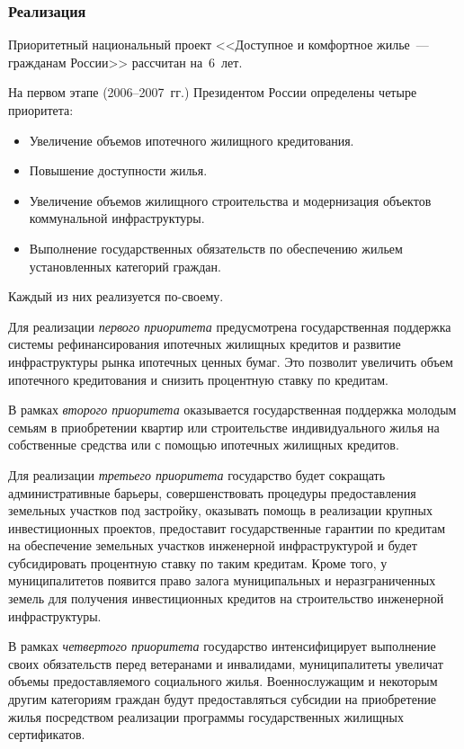 \documentclass[article, 12pt, russian, oneside]{ncc}
\begin{document}
\subsubsection{Реализация}

Приоритетный национальный проект <<Доступное и комфортное жилье~--- гражданам России>> рассчитан на~6~лет.

На первом этапе (2006--2007~гг.) Президентом России определены четыре приоритета:

\begin{itemize}
\item Увеличение объемов ипотечного жилищного кредитования.
\item Повышение доступности жилья.
\item Увеличение объемов жилищного строительства и модернизация объектов коммунальной инфраструктуры.
\item Выполнение государственных обязательств по обеспечению жильем установленных категорий граждан.
\end{itemize}

Каждый из них реализуется по-своему.

Для реализации \emph{первого приоритета} предусмотрена государственная поддержка системы рефинансирования ипотечных жилищных кредитов и развитие инфраструктуры рынка ипотечных ценных бумаг. Это позволит увеличить объем ипотечного кредитования и снизить процентную ставку по кредитам.

В рамках \emph{второго приоритета} оказывается государственная поддержка молодым семьям в приобретении квартир или строительстве индивидуального жилья на собственные средства или с помощью ипотечных жилищных кредитов.

Для реализации \emph{третьего приоритета} государство будет сокращать административные барьеры, совершенствовать процедуры предоставления земельных участков под застройку, оказывать помощь в реализации крупных инвестиционных проектов, предоставит государственные гарантии по кредитам на обеспечение земельных участков инженерной инфраструктурой и будет субсидировать процентную ставку по таким кредитам. Кроме того, у муниципалитетов появится право залога муниципальных и неразграниченных земель для получения инвестиционных кредитов на строительство инженерной инфраструктуры.

В рамках \emph{четвертого приоритета} государство интенсифицирует выполнение своих обязательств перед ветеранами и инвалидами, муниципалитеты увеличат объемы предоставляемого социального жилья. Военнослужащим и некоторым другим категориям граждан будут предоставляться субсидии на приобретение жилья посредством реализации программы государственных жилищных сертификатов.
\end{document}
